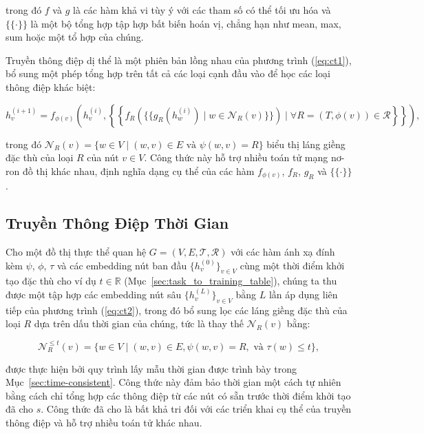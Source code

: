 trong đó $f$ và $g$ là các hàm khả vi tùy ý với các tham số có thể tối ưu hóa và $\{\!\!\{\cdot\}\!\!\}$ là một bộ tổng hợp tập hợp bất biến hoán vị, chẳng hạn như mean, max, sum hoặc một tổ hợp của chúng.

Truyền thông điệp dị thể \cite{schlichtkrull2018modeling, hu2020heterogeneous} là một phiên bản lồng nhau của phương trình (\ref{eq:ct1}), bổ sung một phép tổng hợp trên tất cả các loại cạnh đầu vào để học các loại thông điệp khác biệt:

\begin{equation}
\label{eq:ct2}
h_v^{(i+1)} = f_{\phi(v)}\left(h_v^{(i)}, \left\{\!\!\left\{f_R\left(\{\!\!\{g_R(h_w^{(i)}) \mid w \in \mathcal{N}_R(v)\}\!\!\}\right) \mid \forall R = (T, \phi(v)) \in \mathcal{R}\right\}\!\!\right\}\right),
\end{equation}

trong đó $\mathcal{N}_R(v) = \{w \in V \mid (w,v) \in E \text{ và } \psi(w,v) = R\}$ biểu thị láng giềng đặc thù của loại $R$ của nút $v \in V$. Công thức này hỗ trợ nhiều toán tử mạng nơ-ron đồ thị khác nhau, định nghĩa dạng cụ thể của các hàm $f_{\phi(v)}$, $f_R$, $g_R$ và $\{\!\!\{\cdot\}\!\!\}$ \cite{fey2019fast}.

\subsection*{Truyền Thông Điệp Thời Gian}

Cho một đồ thị thực thể quan hệ $G = (V, E, \mathcal{T}, \mathcal{R})$ với các hàm ánh xạ đính kèm $\psi$, $\phi$, $\tau$ và các embedding nút ban đầu $\{h_v^{(0)}\}_{v \in V}$ cùng một thời điểm khởi tạo đặc thù cho ví dụ $t \in \mathbb{R}$ (Mục~\ref{sec:task_to_training_table}), chúng ta thu được một tập hợp các embedding nút sâu $\{h_v^{(L)}\}_{v \in V}$ bằng $L$ lần áp dụng liên tiếp của phương trình (\ref{eq:ct2}), trong đó bổ sung lọc các láng giềng đặc thù của loại $R$ dựa trên dấu thời gian của chúng, tức là thay thế $\mathcal{N}_R(v)$ bằng:

\begin{equation}
\mathcal{N}_R^{\leq t}(v) = \{w \in V \mid (w,v) \in E, \psi(w,v) = R, \text{ và } \tau(w) \leq t\},
\end{equation}

được thực hiện bởi quy trình lấy mẫu thời gian được trình bày trong Mục~\ref{sec:time-consistent}. Công thức này đảm bảo thời gian một cách tự nhiên bằng cách chỉ tổng hợp các thông điệp từ các nút có sẵn trước thời điểm khởi tạo đã cho $s$. Công thức đã cho là bất khả tri đối với các triển khai cụ thể của truyền thông điệp và hỗ trợ nhiều toán tử khác nhau.

